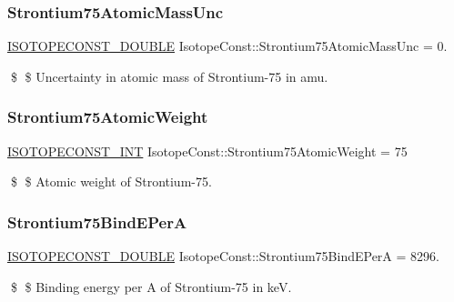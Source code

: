 \subsubsection{\texorpdfstring{Strontium75\+Atomic\+Mass\+Unc}{Strontium75AtomicMassUnc}}
{\footnotesize\ttfamily \mbox{\hyperlink{group___isotope_const-_macros_ga8f45a7272ce02c0b4c65c44636ed719a}{I\+S\+O\+T\+O\+P\+E\+C\+O\+N\+S\+T\+\_\+\+D\+O\+U\+B\+LE}} Isotope\+Const\+::\+Strontium75\+Atomic\+Mass\+Unc = 0.}

\$ \$ Uncertainty in atomic mass of Strontium-\/75 in amu. \mbox{\label{group___isotope_const-_strontium-_sr75_gadf55c127e5ef35d2a478bcefd8ab0ba8}} 
\subsubsection{\texorpdfstring{Strontium75\+Atomic\+Weight}{Strontium75AtomicWeight}}
{\footnotesize\ttfamily \mbox{\hyperlink{group___isotope_const-_macros_ga5f18360b3e99483a35c32d789e62621c}{I\+S\+O\+T\+O\+P\+E\+C\+O\+N\+S\+T\+\_\+\+I\+NT}} Isotope\+Const\+::\+Strontium75\+Atomic\+Weight = 75}

\$ \$ Atomic weight of Strontium-\/75. \mbox{\label{group___isotope_const-_strontium-_sr75_ga7d72f9288a7ecdb8022f7ac20239cefc}} 
\subsubsection{\texorpdfstring{Strontium75\+Bind\+E\+PerA}{Strontium75BindEPerA}}
{\footnotesize\ttfamily \mbox{\hyperlink{group___isotope_const-_macros_ga8f45a7272ce02c0b4c65c44636ed719a}{I\+S\+O\+T\+O\+P\+E\+C\+O\+N\+S\+T\+\_\+\+D\+O\+U\+B\+LE}} Isotope\+Const\+::\+Strontium75\+Bind\+E\+PerA = 8296.}

\$ \$ Binding energy per A of Strontium-\/75 in keV. \mbox{\label{group___isotope_const-_strontium-_sr75_gacb9f1e9acdaf1168d2c7a7f844ab51ef}} 
